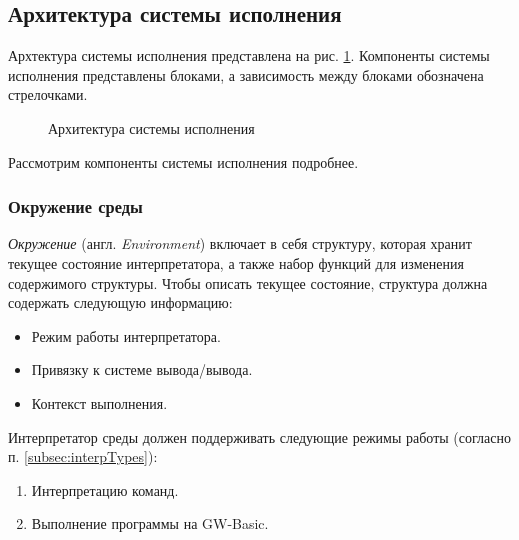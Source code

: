 \documentclass[12pt]{article}
\begin{document}
		\subsection{Архитектура системы исполнения}
			\label{subsec:runtimeArch}
			\hspace{\parindent} Архтектура системы исполнения представлена на рис. \ref{fig:runtimeArch}. Компоненты системы исполнения представлены блоками, а зависимость между блоками обозначена стрелочками. 	
			\begin{figure}[h]
				\caption{Архитектура системы исполнения}
				\label{fig:runtimeArch}
			\end{figure}
			
			\indent Рассмотрим компоненты системы исполнения подробнее. 
			
			\subsubsection{Окружение среды}
			\label{subsec:environment}
			\hspace{\parindent} {\it Окружение} (англ. {\it Environment}) включает в себя структуру, которая хранит текущее состояние интерпретатора, а также набор функций для изменения содержимого структуры. Чтобы описать текущее состояние, структура должна содержать следующую информацию:
			\begin{itemize}
				\item Режим работы интерпретатора.
				\item Привязку к системе вывода/вывода.
				\item Контекст выполнения.
			\end{itemize}
			
			\indent Интерпретатор среды должен поддерживать следующие режимы работы (согласно п. \ref{subsec:interpTypes}):
			\begin{enumerate}
				\item Интерпретацию команд.
				\item Выполнение программы на GW-Basic.
			\end{enumerate}
\end{document}
